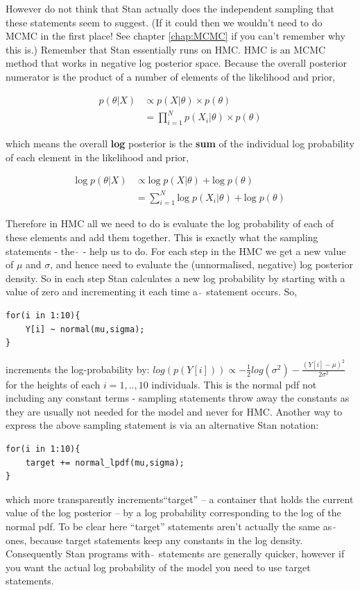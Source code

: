 \documentclass[11pt,fullpage]{book}
\begin{document}
However do not think that Stan actually does the independent sampling that these statements seem to suggest. (If it could then we wouldn't need to do MCMC in the first place! See chapter \ref{chap:MCMC} if you can't remember why this is.) Remember that Stan essentially runs on HMC. HMC is an MCMC method that works in negative log posterior space. Because the overall posterior numerator is the product of a number of elements of the likelihood and prior,

\begin{align}
p(\theta|X) &\propto p(X|\theta) \times p(\theta)\\
&= \prod_{i=1}^{N} p(X_i|\theta) \times p(\theta)
\end{align}

which means the overall \textbf{log} posterior is the \textbf{sum} of the individual log probability of each element in the likelihood and prior,

\begin{align}
\text{log}\; p(\theta|X) &\propto \text{log}\; p(X|\theta) + \text{log}\; p(\theta)\\
&= \sum_{i=1}^{N} \text{log}\;p(X_i|\theta) + \text{log}\; p(\theta)
\end{align}

Therefore in HMC all we need to do is evaluate the log probability of each of these elements and add them together. This is exactly what the sampling statements - the $\tilde{~}$ - help us to do. For each step in the HMC we get a new value of $\mu$ and $\sigma$, and hence need to evaluate the (unnormalised, negative) log posterior density. So in each step Stan calculates a new log probability by starting with a value of zero and incrementing it each time a $\tilde{~}$ statement occurs. So,

	\begin{verbatim}
for(i in 1:10){
    Y[i] ~ normal(mu,sigma);
}
	\end{verbatim}
	
increments the log-probability by: $log(p(Y[i])) \propto -\frac{1}{2} log(\sigma^2)- \frac{(Y[i]-\mu)^2}{2\sigma^2}$ for the heights of each $i=1,..,10$ individuals. This is the normal pdf not including any constant terms - sampling statements throw away the constants as they are usually not needed for the model and never for HMC. Another way to express the above sampling statement is via an alternative Stan notation:
	\begin{verbatim}
for(i in 1:10){
    target += normal_lpdf(mu,sigma);
}
	\end{verbatim}
which more transparently increments``target'' -- a container that holds the current value of the log posterior -- by a log probability corresponding to the log of the normal pdf. To be clear here ``target'' statements aren't actually the same as $\tilde{~}$ ones, because target statements keep any constants in the log density. Consequently Stan programs with $\tilde{~}$ statements are generally quicker, however if you want the actual log probability of the model you need to use target statements.
\end{document}
